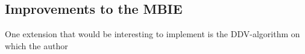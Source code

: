 \subsection{Improvements to the MBIE}
One extension that would be interesting to implement is the DDV-algorithm on which the author 